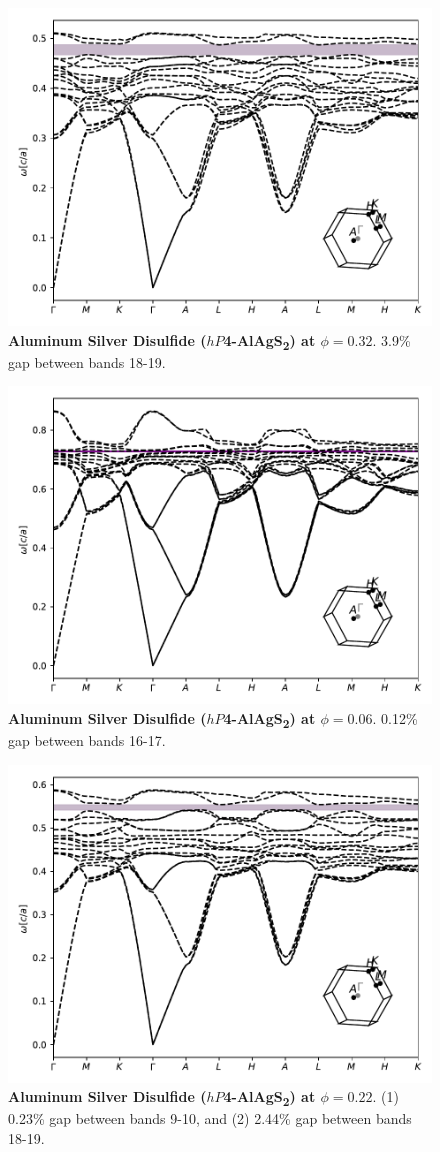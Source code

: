 \documentclass[fleqn,amsmath,amssymb,superscriptaddress, reprint,prl]{revtex4-1}
\begin{document}
\begin{figure}
\includegraphics[width=0.9\linewidth]{workspace/0c6e54f3856c9c96712701c1b7d1b73a/images/r=32.pdf}
	\caption{\textbf{Aluminum Silver Disulfide ($hP$4-AlAgS\textsubscript{2}) at $\phi=0.32$}. 3.9\% gap between bands 18-19.}
\end{figure}

\begin{figure}
\includegraphics[width=0.9\linewidth]{workspace/0c6e54f3856c9c96712701c1b7d1b73a/images/r=18.pdf}
	\caption{\textbf{Aluminum Silver Disulfide ($hP$4-AlAgS\textsubscript{2}) at $\phi=0.06$}. 0.12\% gap between bands 16-17.}
\end{figure}

\begin{figure}
\includegraphics[width=0.9\linewidth]{workspace/0c6e54f3856c9c96712701c1b7d1b73a/images/r=28.pdf}
	\caption{\textbf{Aluminum Silver Disulfide ($hP$4-AlAgS\textsubscript{2}) at $\phi=0.22$}. (1) 0.23\% gap between bands 9-10, and (2) 2.44\% gap between bands 18-19.}
\end{figure}
\end{document}
